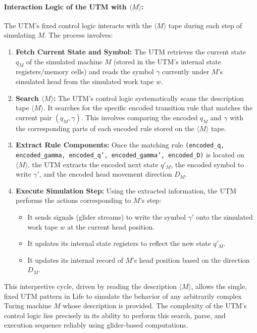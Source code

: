 \documentclass{article}
\theoremstyle{definition}
\theoremstyle{plain}
\theoremstyle{plain}
\begin{document}
\paragraph{Interaction Logic of the UTM with $\langle M \rangle$:}
The UTM's fixed control logic interacts with the $\langle M \rangle$ tape during each step of simulating $M$. The process involves:
\begin{enumerate}
  \item \textbf{Fetch Current State and Symbol:} The UTM retrieves the current state $q_M$ of the simulated machine $M$ (stored in the UTM's internal state registers/memory cells) and reads the symbol $\gamma$ currently under $M$'s simulated head from the simulated work tape $w$.
  \item \textbf{Search $\langle M \rangle$:} The UTM's control logic systematically scans the description tape $\langle M \rangle$. It searches for the specific encoded transition rule that matches the current pair $(q_M, \gamma)$. This involves comparing the encoded $q_M$ and $\gamma$ with the corresponding parts of each encoded rule stored on the $\langle M \rangle$ tape.
  \item \textbf{Extract Rule Components:} Once the matching rule 
  \texttt{(encoded\_q, encoded\_gamma, encoded\_q', encoded\_gamma', encoded\_D)} 
  is located on $\langle M \rangle$, the UTM extracts the encoded next state 
  $q'_M$, the encoded symbol to write $\gamma'$, and the encoded head movement 
  direction $D_M$.
  \item \textbf{Execute Simulation Step:} Using the extracted information, the UTM performs the actions corresponding to $M$'s step:
    \begin{itemize}
      \item It sends signals (glider streams) to write the symbol $\gamma'$ onto the simulated work tape $w$ at the current head position.
      \item It updates its internal state registers to reflect the new state $q'_M$.
      \item It updates its internal record of $M$'s head position based on the direction $D_M$.
    \end{itemize}
\end{enumerate}
This interpretive cycle, driven by reading the description $\langle M \rangle$, allows the single, fixed UTM pattern in Life to simulate the behavior of any arbitrarily complex Turing machine $M$ whose description is provided. The complexity of the UTM's control logic lies precisely in its ability to perform this search, parse, and execution sequence reliably using glider-based computations.
\end{document}
